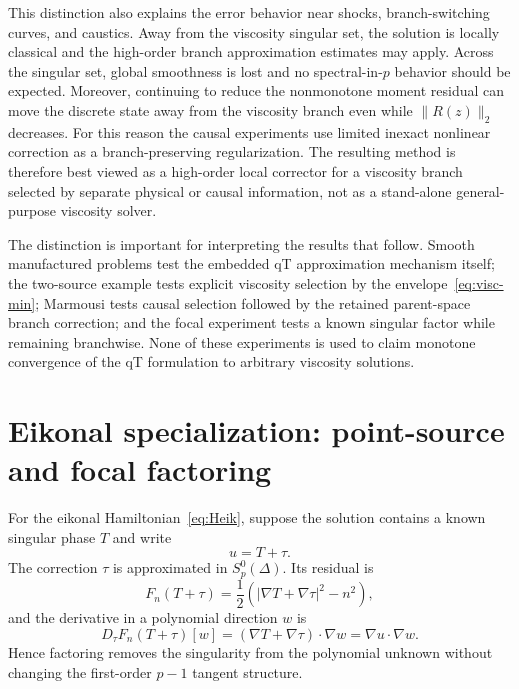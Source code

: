 \documentclass[preprint,12pt]{elsarticle}
\newcommand{\grad}{\nabla}
\newcommand{\abs}[1]{\left\lvert #1\right\rvert}
\begin{document}
This distinction also explains the error behavior near shocks, branch-switching curves, and caustics.  Away from the viscosity singular set, the solution is locally classical and the high-order branch approximation estimates may apply.  Across the singular set, global smoothness is lost and no spectral-in-$p$ behavior should be expected.  Moreover, continuing to reduce the nonmonotone moment residual can move the discrete state away from the viscosity branch even while $\|R(z)\|_2$ decreases.  For this reason the causal experiments use limited inexact nonlinear correction as a branch-preserving regularization.  The resulting method is therefore best viewed as a high-order local corrector for a viscosity branch selected by separate physical or causal information, not as a stand-alone general-purpose viscosity solver.

The distinction is important for interpreting the results that follow.  Smooth manufactured problems test the embedded qT approximation mechanism itself; the two-source example tests explicit viscosity selection by the envelope~\eqref{eq:visc-min}; Marmousi tests causal selection followed by the retained parent-space branch correction; and the focal experiment tests a known singular factor while remaining branchwise.  None of these experiments is used to claim monotone convergence of the qT formulation to arbitrary viscosity solutions.

\section{Eikonal specialization: point-source and focal factoring}\label{sec:factoring}
For the eikonal Hamiltonian~\eqref{eq:Heik}, suppose the solution contains a known singular phase $T$ and write
\begin{equation}\label{eq:factor}
  u=T+\tau.
\end{equation}
The correction $\tau$ is approximated in $S_p^0(\Delta)$.  Its residual is
\begin{equation}\label{eq:factres}
 F_n(T+\tau)=\frac12\left(\abs{\grad T+\grad\tau}^2-n^2\right),
\end{equation}
and the derivative in a polynomial direction $w$ is
\begin{equation}\label{eq:factlin}
 D_\tau F_n(T+\tau)[w]=(\grad T+\grad\tau)\cdot\grad w=\grad u\cdot\grad w.
\end{equation}
Hence factoring removes the singularity from the polynomial unknown without changing the first-order $p-1$ tangent structure.
\end{document}
